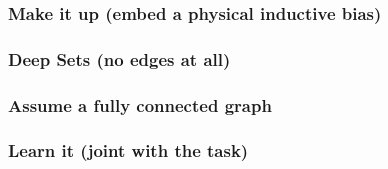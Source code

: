 \subsubsection{Make it up (embed a physical inductive bias)}

\subsubsection{Deep Sets (no edges at all)}

\subsubsection{Assume a fully connected graph}

\subsubsection{Learn it (joint with the task)}


